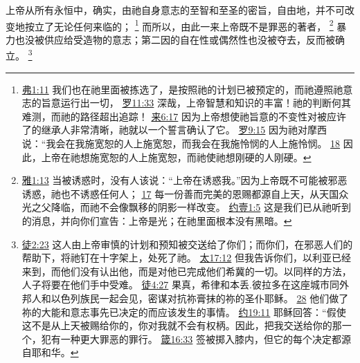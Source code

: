 \documentclass[12pt, a4paper, oneside]{ctexart}
\newcounter{parnum}[section]
\newcommand{\N}{%
   \noindent\refstepcounter{parnum}%
    \makebox[\parindent][l]{\textbf{\arabic{parnum}.}}}
\begin{document}
\N 上帝从所有永恒中，确实，由祂自身意志的至智和至圣的密旨，自由地，并不可改变地按立了无论任何来临的；
	\footnote {
		\href{https://biblehub.com/ephesians/1-11.htm}{弗1:11} 我们也在祂里面被拣选了，是按照祂的计划已被预定的，而祂遵照祂意志的旨意运行出一切，
		\href{https://biblehub.com/romans/11-33.htm}{罗11:33} 深哉，上帝智慧和知识的丰富！祂的判断何其难测，而祂的路径超出追踪！
		\href{https://biblehub.com/hebrews/6-17.htm}{来6:17} 因为上帝想使祂旨意的不变性对被应许了的继承人非常清晰，祂就以一个誓言确认了它。
		\href{https://biblehub.com/romans/9-15.htm}{罗9:15} 因为祂对摩西说：“我会在我施宽恕的人上施宽恕，而我会在我施怜悯的人上施怜悯。
		\href{https://biblehub.com/romans/9-18.htm}{18} 因此，上帝在祂想施宽恕的人上施宽恕，而祂使祂想刚硬的人刚硬。
	}
	而所以，由此一来上帝既不是罪恶的著者，
	\footnote {
		\href{https://biblehub.com/james/1-13.htm}{雅1:13} 当被诱惑时，没有人该说：“上帝在诱惑我。”因为上帝既不可能被邪恶诱惑，祂也不诱惑任何人；
		\href{https://biblehub.com/james/1-17.htm}{17} 每一份善而完美的恩赐都源自上天，从天国众光之父降临，而祂不会像飘移的阴影一样改变。
		\href{https://biblehub.com/1_john/1-5.htm}{约壹1:5} 这是我们已从祂听到的消息，并向你们宣告：上帝是光；在祂里面根本没有黑暗。
	}
	暴力也没被供应给受造物的意志；第二因的自在性或偶然性也没被夺去，反而被确立。
	\footnote {
		\href{https://biblehub.com/acts/2-23.htm}{徒2:23} 这人由上帝审慎的计划和预知被交送给了你们；而你们，在邪恶人们的帮助下，将祂钉在十字架上，处死了祂。
		\href{https://biblehub.com/matthew/17-12.htm}{太17:12} 但我告诉你们，以利亚已经来到，而他们没有认出他，而是对他已完成他们希冀的一切。以同样的方法，人子将要在他们手中受难。
		\href{https://biblehub.com/acts/4-27.htm}{徒4:27} 果真，希律和本丢.彼拉多在这座城市同外邦人和以色列族民一起会见，密谋对抗祢膏抹的祢的圣仆耶稣。
		\href{https://biblehub.com/acts/4-28.htm}{28} 他们做了祢的大能和意志事先已决定的而应该发生的事情。
		\href{https://biblehub.com/john/19-11.htm}{约19:11} 耶稣回答：“假使这不是从上天被赐给你的，你对我就不会有权柄。因此，把我交送给你的那一个，犯有一种更大罪恶的罪行。
		\href{https://biblehub.com/proverbs/16-33.htm}{箴16:33} 签被掷入膝内，但它的每个决定都源自耶和华。
	}
\end{document}
